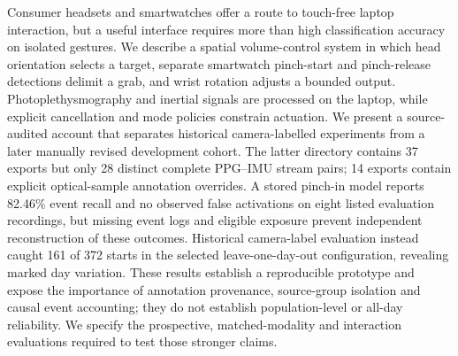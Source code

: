 Consumer headsets and smartwatches offer a route to touch-free laptop interaction, but a useful interface requires more than high classification accuracy on isolated gestures. We describe a spatial volume-control system in which head orientation selects a target, separate smartwatch pinch-start and pinch-release detections delimit a grab, and wrist rotation adjusts a bounded output. Photoplethysmography and inertial signals are processed on the laptop, while explicit cancellation and mode policies constrain actuation. We present a source-audited account that separates historical camera-labelled experiments from a later manually revised development cohort. The latter directory contains 37 exports but only 28 distinct complete PPG--IMU stream pairs; 14 exports contain explicit optical-sample annotation overrides. A stored pinch-in model reports 82.46\% event recall and no observed false activations on eight listed evaluation recordings, but missing event logs and eligible exposure prevent independent reconstruction of these outcomes. Historical camera-label evaluation instead caught 161 of 372 starts in the selected leave-one-day-out configuration, revealing marked day variation. These results establish a reproducible prototype and expose the importance of annotation provenance, source-group isolation and causal event accounting; they do not establish population-level or all-day reliability. We specify the prospective, matched-modality and interaction evaluations required to test those stronger claims.
